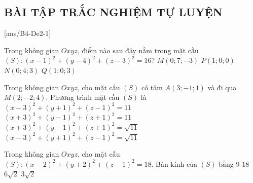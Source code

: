 \subsection{BÀI TẬP TRẮC NGHIỆM TỰ LUYỆN}
\TN
	\setcounter{ex}{0}
	[ans/B4-De2-1]

\begin{ex}%
	Trong không gian $Oxyz$, điểm nào sau đây nằm trong mặt cầu $(S)\colon \left(x-1\right)^2+\left(y-4\right)^2+\left(z-3\right)^2=16$?
	\choice
	{$M\left(0;7;-3\right)$}
	{$P\left(1;0;0\right)$}
	{\True $N\left(0;4;3\right)$}
	{$Q\left(1;0;3\right)$}
\end{ex}

\begin{ex}%
	Trong không gian $Oxyz$, cho mặt cầu $(S)$ có tâm $A\left(3;-1;1\right)$ và đi qua $M\left(2;-2;4\right)$. Phương trình mặt cầu $(S)$ là
	\choice
	{\True $\left(x-3\right)^2+\left(y+1\right)^2+\left(z-1\right)^2=11$}
	{$\left(x+3\right)^2+\left(y-1\right)^2+\left(z+1\right)^2=11$}
	{$\left(x+3\right)^2+\left(y-1\right)^2+\left(z+1\right)^2=\sqrt{11}$}
	{$\left(x-3\right)^2+\left(y+1\right)^2+\left(z-1\right)^2=\sqrt{11}$}
\end{ex}

\begin{ex}%
	Trong không gian $Oxyz$, cho mặt cầu $(S):\left(x-2\right)^2+\left(y+2\right)^2+\left(z-1\right)^2=18$. Bán kính của $(S)$ bằng
	\choice
	{$9$}
	{$18$}
	{$6\sqrt{2}$}
	{\True $3\sqrt{2}$}
\end{ex}

